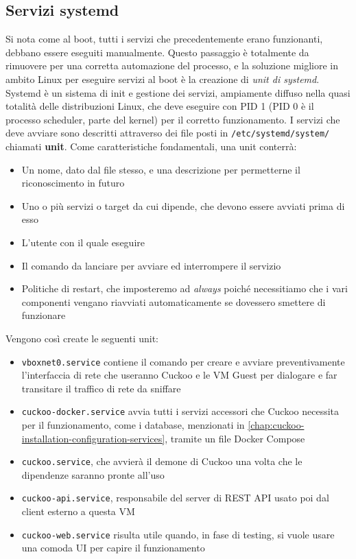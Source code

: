 \subsection{Servizi systemd}
Si nota come al boot, tutti i servizi che precedentemente erano funzionanti, debbano essere eseguiti manualmente. Questo passaggio è totalmente da rimuovere per una corretta automazione del processo, e la soluzione migliore in ambito Linux per eseguire servizi al boot è la creazione di \emph{unit di systemd}. Systemd è un sistema di init e gestione dei servizi, ampiamente diffuso nella quasi totalità delle distribuzioni Linux, che deve eseguire con PID 1 (PID 0 è il processo scheduler, parte del kernel) per il corretto funzionamento. I servizi che deve avviare sono descritti attraverso dei file posti in \texttt{/etc/systemd/system/} chiamati \textbf{unit}.
Come caratteristiche fondamentali, una unit conterrà:
\begin{itemize}
    \item Un nome, dato dal file stesso, e una descrizione per permetterne il riconoscimento in futuro
    \item Uno o più servizi o target da cui dipende, che devono essere avviati prima di esso
    \item L'utente con il quale eseguire
    \item Il comando da lanciare per avviare ed interrompere il servizio
    \item Politiche di restart, che imposteremo ad \emph{always}
    poiché necessitiamo che i vari componenti vengano riavviati automaticamente se dovessero smettere di funzionare
\end{itemize}

Vengono così create le seguenti unit:
\begin{itemize}
    \item \texttt{vboxnet0.service} contiene il comando per creare e avviare preventivamente l'interfaccia di rete
    che useranno Cuckoo e le VM Guest per dialogare e far transitare il traffico di rete da sniffare
    \item \texttt{cuckoo-docker.service} avvia tutti i servizi accessori che Cuckoo
    necessita per il funzionamento, come i database, menzionati in \ref{chap:cuckoo-installation-configuration-services},
    tramite un file Docker Compose
    \item \texttt{cuckoo.service}, che avvierà il demone di Cuckoo una volta che le dipendenze saranno pronte all'uso
    \item \texttt{cuckoo-api.service}, responsabile del server di REST API usato poi dal client esterno a questa VM
    \item \texttt{cuckoo-web.service} risulta utile quando, in fase di testing, si vuole usare una comoda UI per capire il funzionamento
\end{itemize}

